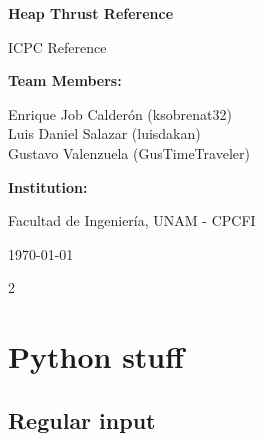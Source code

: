 \documentclass[10pt,letterpaper,landscape,twocolumn]{article}
\begin{document}
\onecolumn
\thispagestyle{empty} %
\begin{center}
    \vspace*{2cm}
    
    {\Huge \textbf{Heap Thrust Reference}}
    
    \vspace{1.5cm}
    
    {\Large ICPC Reference}
    
    \vspace{2cm}
    
    {\large \textbf{Team Members:}}
    
    \vspace{0.5cm}
    
    {\large
    Enrique Job Calderón (ksobrenat32)\\
    Luis Daniel Salazar (luisdakan)\\
    Gustavo Valenzuela (GusTimeTraveler)\\
    }
    
    \vspace{2cm}
    
    {\large \textbf{Institution:}}
    
    {\large Facultad de Ingeniería, UNAM - CPCFI}
    
    \vspace{2cm}
    
    {\large \today}
    
\end{center}

\newpage

\setcounter{page}{1} %
\pagestyle{fancy} %
\begin{multicols}{2}
\tableofcontents
\end{multicols}

\newpage

\twocolumn

\section{Python stuff}

\subsection{Regular input}


\end{document}

